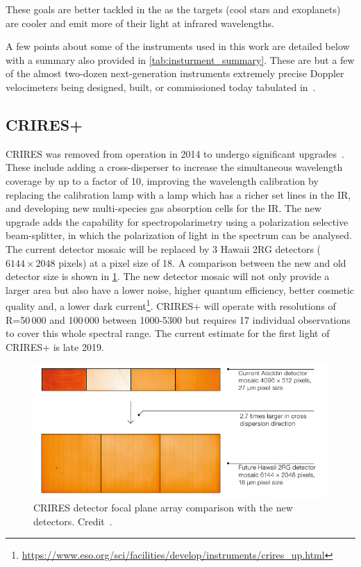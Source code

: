 These goals are better tackled in the \nir{} as the targets (cool stars and exoplanets) are cooler and emit more of their light at infrared wavelengths.

A few points about some of the \nir{} instruments used in this work are detailed below with a summary also provided in \cref{tab:insturment_summary}.
These are but a few of the almost two-dozen next-generation instruments extremely precise Doppler velocimeters being designed, built, or commissioned today tabulated in~\citet{wright_third_2017}.



\subsection{CRIRES+}
\label{subsec:criresplus}
CRIRES was removed from operation in 2014 to undergo significant upgrades~\citep{dorn_crires_2014}.
These include adding a cross-disperser to increase the simultaneous wavelength coverage by up to a factor of 10, improving the wavelength calibration by replacing the \thar{} calibration lamp with a \une{} lamp which has a richer set lines in the IR, and developing new multi-species gas absorption cells for the {IR}.
The new upgrade adds the capability for spectropolarimetry using a polarization selective beam-splitter, in which the polarization of light in the spectrum can be analysed.
The current detector mosaic will be replaced by 3 Hawaii 2RG detectors (\(6144\times 2048\) pixels) at a pixel size of 18\um{}.
A comparison between the new and old detector size is shown in \cref{fig:criresplus_detecotrs}.
The new detector mosaic will not only provide a larger area but also have a lower noise, higher quantum efficiency, better cosmetic quality and, a lower dark current\footnote{\href{https://www.eso.org/sci/facilities/develop/instruments/crires_up.html}{https://www.eso.org/sci/facilities/develop/instruments/crires\_up.html}}.
CRIRES+ will operate with resolutions of R=50\,000 and 100\,000 between 1000-5300\nm{} but requires 17 individual observations to cover this whole spectral range.
The current estimate for the first light of CRIRES+ is late 2019.

\begin{figure}
    \centering
    \includegraphics[width=0.6\linewidth]{figures/spectroscopy/criresplus_detectors.pdf}
    \caption[CRIRES/CRIRES+ detector focal plane arrays.]{CRIRES detector focal plane array comparison with the new detectors.
    Credit~\citet{dorn_crires_2014}.}
    \label{fig:criresplus_detecotrs}
\end{figure}

